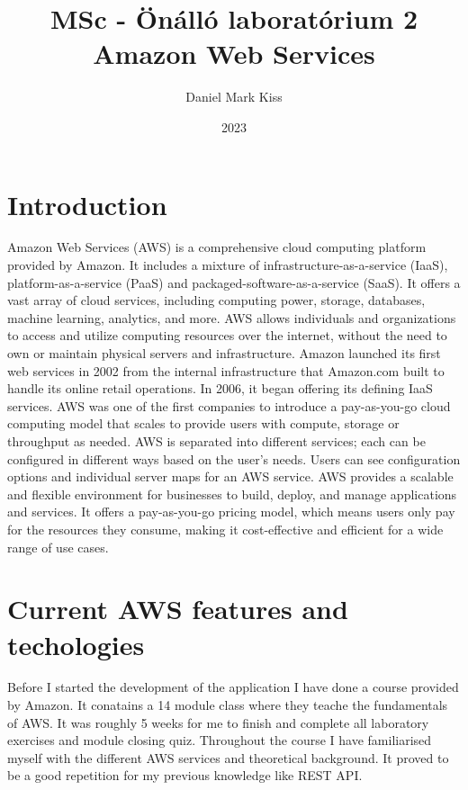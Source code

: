 \documentclass[11pt,a4paper,oneside]{report}
\title{\Huge{MSc - Önálló laboratórium 2}\\Amazon Web Services}
\author{\huge{Daniel Mark Kiss}}
\date{2023}
\begin{document}
\maketitle
\newpage
\tableofcontents
\pagebreak

\chapter{Introduction}

Amazon Web Services (AWS) is a comprehensive cloud computing platform provided by Amazon. It includes a mixture of infrastructure-as-a-service (IaaS), platform-as-a-service (PaaS) and packaged-software-as-a-service (SaaS). It offers a vast array of cloud services, including computing power, storage, databases, machine learning, analytics, and more. AWS allows individuals and organizations to access and utilize computing resources over the internet, without the need to own or maintain physical servers and infrastructure.
Amazon launched its first web services in 2002 from the internal infrastructure that Amazon.com built to handle its online retail operations. In 2006, it began offering its defining IaaS services. AWS was one of the first companies to introduce a pay-as-you-go cloud computing model that scales to provide users with compute, storage or throughput as needed.
AWS is separated into different services; each can be configured in different ways based on the user's needs. Users can see configuration options and individual server maps for an AWS service. AWS provides a scalable and flexible environment for businesses to build, deploy, and manage applications and services. It offers a pay-as-you-go pricing model, which means users only pay for the resources they consume, making it cost-effective and efficient for a wide range of use cases. \cite{techtagaws}

\chapter{Current AWS features and techologies}

Before I started the development of the application I have done a course provided by Amazon. It conatains a 14 module class where they teache the fundamentals of AWS.
It was roughly 5 weeks for me to finish and complete all laboratory exercises and module closing quiz. Throughout the course I have familiarised myself with the different AWS services and theoretical background. It proved to be a good repetition for my previous knowledge like REST API. \cite{awsacademy}
\end{document}
